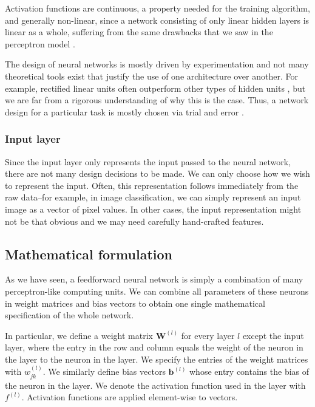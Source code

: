 Activation functions are continuous, a property needed for the training algorithm, and generally non-linear, since a network consisting of only linear hidden layers is linear as a whole, suffering from the same drawbacks that we saw in the perceptron model \cite[Ch.\,6,\,p.\,190]{DBLP:books/daglib/0040158}.

The design of neural networks is mostly driven by experimentation and not many theoretical tools exist that justify the use of one architecture over another. For example, rectified linear units often outperform other types of hidden units \cite{DBLP:journals/jmlr/GlorotBB11 ,DBLP:conf/nips/KrizhevskySH12}, but we are far from a rigorous understanding of why this is the case. Thus, a network design for a particular task is mostly chosen via trial and error \cite[Ch.\,6,\,pp.\,185-187]{DBLP:books/daglib/0040158}.

\subsubsection{Input layer}
Since the input layer only represents the input passed to the neural network, there are not many design decisions to be made. We can only choose how we wish to represent the input. Often, this representation follows immediately from the raw data--for example, in image classification, we can simply represent an input image as a vector of pixel values. In other cases, the input representation might not be that obvious and we may need carefully hand-crafted features.

\subsection{Mathematical formulation}
As we have seen, a feedforward neural network is simply a combination of many perceptron-like computing units. We can combine all parameters of these neurons in weight matrices and bias vectors to obtain one single mathematical specification of the whole network.

In particular, we define a weight matrix $\bm{W}^{(l)}$ for every layer $l$ except the input layer, where the entry in the  row and  column equals the weight of the  neuron in the  layer to the  neuron in the  layer. We specify the entries of the weight matrices with $w_{jk}^{(l)}$. We similarly define bias vectors $\bm{b}^{(l)}$ whose  entry contains the bias of the  neuron in the  layer. We denote the activation function used in the  layer with $f^{(l)}$. Activation functions are applied element-wise to vectors.

